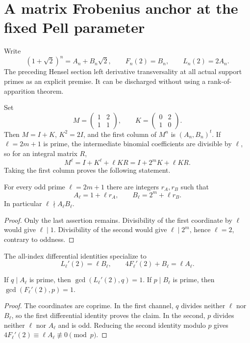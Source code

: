 \section{A matrix Frobenius anchor at the fixed Pell parameter}
\label{sec:pell-fixed-two-transversality}

Write
\[
 (1+\sqrt2)^n=A_n+B_n\sqrt2,
 \qquad F_n(2)=B_n,\qquad L_n(2)=2A_n.
\]
The preceding Hensel section left derivative transversality at all actual
support primes as an explicit premise.  It can be discharged without using
a rank-of-apparition theorem.

Set
\[
 M=\begin{pmatrix}1&2\\1&1\end{pmatrix},\qquad
 K=\begin{pmatrix}0&2\\1&0\end{pmatrix}.
\]
Then $M=I+K$, $K^2=2I$, and the first column of $M^n$ is
$(A_n,B_n)^t$.  If $\ell=2m+1$ is prime, the intermediate binomial
coefficients are divisible by $\ell$, so for an integral matrix $R$,
\[
 M^\ell=I+K^\ell+\ell KR
       =I+2^mK+\ell KR.
\]
Taking the first column proves the following statement.

\begin{theorem}
\label{thm:fixed-two-frobenius-anchor}
For every odd prime $\ell=2m+1$ there are integers $r_A,r_B$ such that
\[
 A_\ell=1+\ell r_A,
 \qquad B_\ell=2^m+\ell r_B.
\]
In particular $\ell\nmid A_\ell B_\ell$.
\end{theorem}

\begin{proof}
Only the last assertion remains.  Divisibility of the first coordinate by
$\ell$ would give $\ell\mid1$.  Divisibility of the second would give
$\ell\mid2^m$, hence $\ell=2$, contrary to oddness.
\end{proof}

The all-index differential identities specialize to
\[
 L_\ell'(2)=\ell B_\ell,
 \qquad 4F_\ell'(2)+B_\ell=\ell A_\ell.
\]

\begin{theorem}[All-support transversality at $T=2$]
\label{thm:fixed-two-all-support-transverse}
If $q\mid A_\ell$ is prime, then
$\gcd(L_\ell'(2),q)=1$.  If $p\mid B_\ell$ is prime, then
$\gcd(F_\ell'(2),p)=1$.
\end{theorem}

\begin{proof}
The coordinates are coprime.  In the first channel, $q$ divides neither
$\ell$ nor $B_\ell$, so the first differential identity proves the claim.
In the second, $p$ divides neither $\ell$ nor $A_\ell$ and is odd.  Reducing
the second identity modulo $p$ gives
$4F_\ell'(2)\equiv\ell A_\ell\not\equiv0\pmod p$.
\end{proof}

